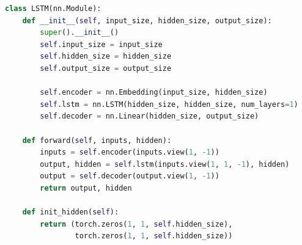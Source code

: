 \begin{lstlisting}[language=Python]
class LSTM(nn.Module):
    def __init__(self, input_size, hidden_size, output_size):
        super().__init__()
        self.input_size = input_size
        self.hidden_size = hidden_size
        self.output_size = output_size

        self.encoder = nn.Embedding(input_size, hidden_size)
        self.lstm = nn.LSTM(hidden_size, hidden_size, num_layers=1)
        self.decoder = nn.Linear(hidden_size, output_size)

    def forward(self, inputs, hidden):
        inputs = self.encoder(inputs.view(1, -1))
        output, hidden = self.lstm(inputs.view(1, 1, -1), hidden)
        output = self.decoder(output.view(1, -1))
        return output, hidden

    def init_hidden(self):
        return (torch.zeros(1, 1, self.hidden_size),
                torch.zeros(1, 1, self.hidden_size))
\end{lstlisting}

\newpage